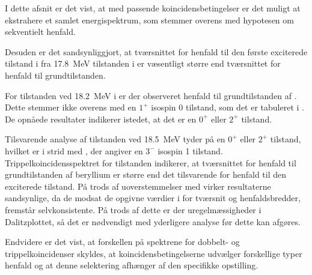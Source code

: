 I dette afsnit er det vist, at med passende koincidensbetingelser er det muligt at ekstrahere et
samlet energispektrum, som stemmer overens med hypotesen om sekventielt henfald.

Desuden er det sandsynliggjort, at tværsnittet for henfald til den første exciterede tilstand i \Be
fra \SI{17.8}{\MeV} tilstanden i \Carb er væsentligt større end tværsnittet for henfald til
grundtilstanden.

For tilstanden ved \SI{18.2}{\MeV} i \Carb er der observeret henfald til grundtilstanden af
\Be. Dette stemmer ikke overens med en $1^{+}$ isospin 0 tilstand, som det er tabuleret i
\cite{States}. De opnåede resultater indikerer istedet, at det er en $0^{+}$ eller $2^{+}$ tilstand.

Tilsvarende analyse af tilstanden ved \SI{18.5}{\MeV} tyder på en $0^{+}$ eller $2^{+}$ tilstand,
hvilket er i strid med \cite{States}, der angiver en $3^{-}$ isospin 1
tilstand. Trippelkoincidensspektret for tilstanden indikerer, at tværsnittet for henfald til
grundtilstanden af beryllium er større end det tilsvarende for henfald til den exciterede
tilstand. På trods af uoverstemmelser med \cite{States} virker resultaterne sandsynlige, da de
modsat de opgivne værdier i \cite{States} for tværsnit og henfaldsbredder, fremstår
selvkonsistente. På trods af dette er der uregelmæssigheder i Dalitzplottet, så det er nødvendigt
med yderligere analyse før dette kan afgøres.
%

Endvidere er det vist, at forskellen på spektrene for dobbelt- og trippelkoincidenser skyldes, at
koincidensbetingelserne udvælger forskellige typer henfald og at denne selektering afhænger af den
specifikke opstilling.
